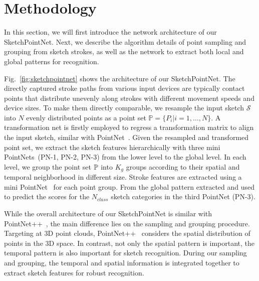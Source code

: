 

\section{Methodology}
\label{sec:methodology}

In this section, we will first introduce the network architecture of our SketchPointNet. Next, we describe the algorithm details of point sampling and grouping from sketch strokes, as well as the network to extract both local and global patterns for recognition.


Fig.~\ref{fig:sketchpointnet} shows the architecture of our SketchPointNet.
%
The directly captured stroke paths from various input devices are typically contact points that distribute unevenly along strokes with different movement speeds and device sizes.
To make them directly comparable, we resample the input sketch $\mathcal{S}$ into $N$ evenly distributed points as a point set $\mathbb{P}=\{P_i|i=1,\ldots,N\}$.
A transformation net is firstly employed to regress a transformation matrix to align the input sketch, similar with PointNet~\cite{qi2017pointnetplusplus}.
%
Given the resampled and transformed point set, we extract the sketch features hierarchically with three mini PointNets~(PN-1, PN-2, PN-3) from the lower level to the global level.
%
In each level, we group the point set $\mathbb{P}$ into $K_g$ groups according to their spatial and temporal neighborhood in different size.
Stroke features are extracted using a mini PointNet~\cite{qi2017pointnetplusplus} for each point group.
%
From the global pattern extracted and used to predict the scores for the $N_{class}$ sketch categories in the third PointNet (PN-3).


While the overall architecture of our SketchPointNet is similar with PointNet++~\cite{qi2017pointnetplusplus}, the main difference lies on the sampling and grouping procedure.
Targeting at 3D point clouds, PointNet++~\cite{qi2017pointnetplusplus} considers the spatial distribution of points in the 3D space.
In contrast, not only the spatial pattern is important, the temporal pattern is also important for sketch recognition.
%
During our sampling and grouping, the temporal and spatial information is integrated together to extract sketch features for robust recognition.


